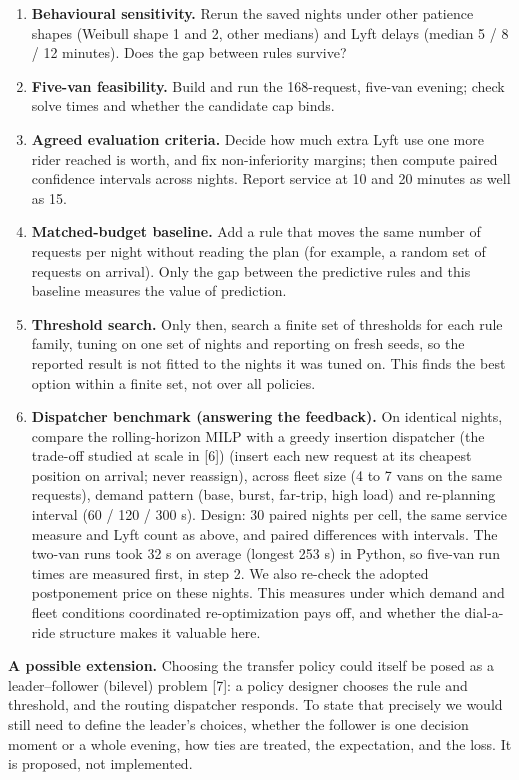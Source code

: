 \documentclass{article}
\begin{document}
\begin{enumerate}\setlength\itemsep{2pt}
\item \textbf{Behavioural sensitivity.} Rerun the saved nights under other patience shapes (Weibull shape 1 and 2, other medians) and Lyft delays (median 5 / 8 / 12 minutes). Does the gap between rules survive?
\item \textbf{Five-van feasibility.} Build and run the 168-request, five-van evening; check solve times and whether the candidate cap binds.
\item \textbf{Agreed evaluation criteria.} Decide how much extra Lyft use one more rider reached is worth, and fix non-inferiority margins; then compute paired confidence intervals across nights. Report service at 10 and 20 minutes as well as 15.
\item \textbf{Matched-budget baseline.} Add a rule that moves the same number of requests per night without reading the plan (for example, a random set of requests on arrival). Only the gap between the predictive rules and this baseline measures the value of prediction.
\item \textbf{Threshold search.} Only then, search a finite set of thresholds for each rule family, tuning on one set of nights and reporting on fresh seeds, so the reported result is not fitted to the nights it was tuned on. This finds the best option within a finite set, not over all policies.
\item \textbf{Dispatcher benchmark (answering the feedback).} On identical nights, compare the rolling-horizon MILP with a greedy insertion dispatcher (the trade-off studied at scale in [6]) (insert each new request at its cheapest position on arrival; never reassign), across fleet size (4 to 7 vans on the same requests), demand pattern (base, burst, far-trip, high load) and re-planning interval (60 / 120 / 300 s). Design: 30 paired nights per cell, the same service measure and Lyft count as above, and paired differences with intervals. The two-van runs took 32 s on average (longest 253 s) in Python, so five-van run times are measured first, in step 2. We also re-check the adopted postponement price on these nights. This measures under which demand and fleet conditions coordinated re-optimization pays off, and whether the dial-a-ride structure makes it valuable here.
\end{enumerate}

\textbf{A possible extension.} Choosing the transfer policy could itself be posed as a leader--follower (bilevel) problem [7]: a policy designer chooses the rule and threshold, and the routing dispatcher responds. To state that precisely we would still need to define the leader's choices, whether the follower is one decision moment or a whole evening, how ties are treated, the expectation, and the loss. It is proposed, not implemented.
\end{document}
